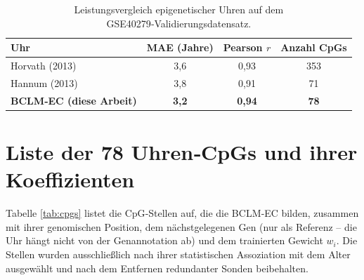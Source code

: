 \documentclass[12pt,a4paper]{article}
\begin{document}
	\begin{table}[H]
		\centering
		\caption{Leistungsvergleich epigenetischer Uhren auf dem GSE40279‑Validierungsdatensatz.}
		\label{tab:clock-comparison}
		\begin{tabular}{lccc}
			\toprule
			\textbf{Uhr} & \textbf{MAE (Jahre)} & \textbf{Pearson \(r\)} & \textbf{Anzahl CpGs} \\
			\midrule
			Horvath (2013) & 3,6 & 0,93 & 353 \\
			Hannum (2013)\footnotemark & 3,8 & 0,91 & 71 \\
			\textbf{BCLM‑EC (diese Arbeit)} & \textbf{3,2} & \textbf{0,94} & \textbf{78} \\
			\bottomrule
		\end{tabular}
	\end{table}
	
	\section{Liste der 78 Uhren‑CpGs und ihrer Koeffizienten}
	\label{sec:cpgs}
	Tabelle \ref{tab:cpgs} listet die CpG‑Stellen auf, die die BCLM‑EC bilden, zusammen mit ihrer genomischen Position, dem nächstgelegenen Gen (nur als Referenz -- die Uhr hängt nicht von der Genannotation ab) und dem trainierten Gewicht \(w_i\). Die Stellen wurden ausschließlich nach ihrer statistischen Assoziation mit dem Alter ausgewählt und nach dem Entfernen redundanter Sonden beibehalten.
	
\end{document}
